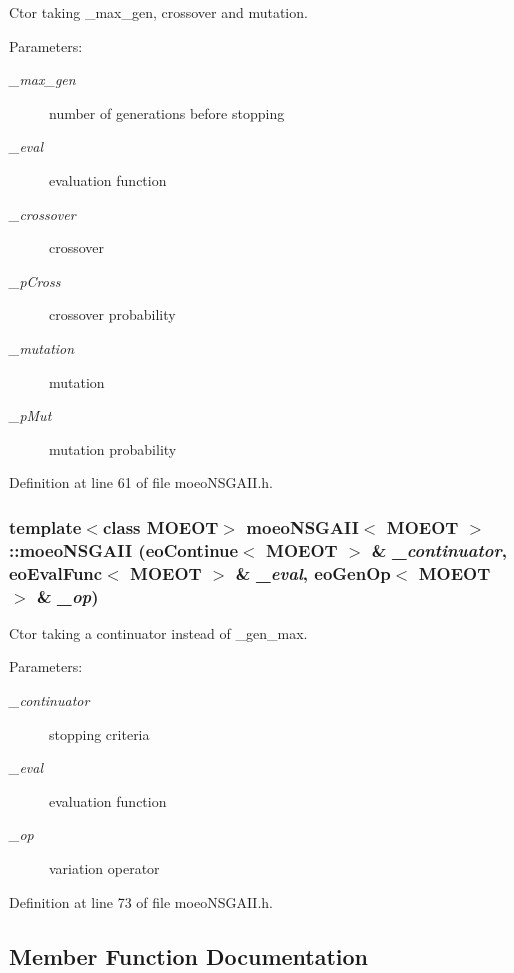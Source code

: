 Ctor taking \_\-max\_\-gen, crossover and mutation. 

\begin{Desc}
\item[Parameters:]
\begin{description}
\item[{\em \_\-max\_\-gen}]number of generations before stopping \item[{\em \_\-eval}]evaluation function \item[{\em \_\-crossover}]crossover \item[{\em \_\-p\-Cross}]crossover probability \item[{\em \_\-mutation}]mutation \item[{\em \_\-p\-Mut}]mutation probability \end{description}
\end{Desc}


Definition at line 61 of file moeo\-NSGAII.h.
\subsubsection{\setlength{\rightskip}{0pt plus 5cm}template$<$class MOEOT$>$ {\bf moeo\-NSGAII}$<$ MOEOT $>$::{\bf moeo\-NSGAII} ({\bf eo\-Continue}$<$ MOEOT $>$ \& {\em \_\-continuator}, {\bf eo\-Eval\-Func}$<$ MOEOT $>$ \& {\em \_\-eval}, {\bf eo\-Gen\-Op}$<$ MOEOT $>$ \& {\em \_\-op})\hspace{0.3cm}{\tt  [inline]}}\label{classmoeoNSGAII_1797f01afde01d155e559522df12ae05}


Ctor taking a continuator instead of \_\-gen\_\-max. 

\begin{Desc}
\item[Parameters:]
\begin{description}
\item[{\em \_\-continuator}]stopping criteria \item[{\em \_\-eval}]evaluation function \item[{\em \_\-op}]variation operator \end{description}
\end{Desc}


Definition at line 73 of file moeo\-NSGAII.h.

\subsection{Member Function Documentation}
